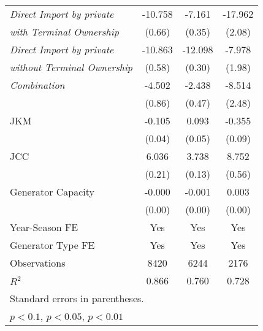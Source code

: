 \documentclass[12pt]{article}
\begin{document}
\begin{table}[htbp]
\begin{tabular}{l*{3}{c}}
\hline \hline
\addlinespace
\textit{Direct Import by private}    &     -10.758\sym{***}&      -7.161\sym{***}&     -17.962\sym{***} \\
\textit{with Terminal Ownership}   &      (0.66)         &      (0.35)         &      (2.08)              \\
\addlinespace
\textit{Direct Import by private}&     -10.863\sym{***}&     -12.098\sym{***}&      -7.978\sym{***}   \\
\textit{without Terminal Ownership}  &      (0.58)         &      (0.30)         &      (1.98)            \\
\addlinespace
\textit{Combination} &      -4.502\sym{***}&      -2.438\sym{***}&      -8.514\sym{***}  \\
                    &      (0.86)         &      (0.47)         &      (2.48)          \\
\addlinespace
JKM                 &      -0.105\sym{**} &       0.093\sym{*}  &      -0.355\sym{***}  \\
                    &      (0.04)         &      (0.05)         &      (0.09)             \\
\addlinespace
JCC                 &       6.036\sym{***}&       3.738\sym{***}&       8.752\sym{***}  \\
                    &      (0.21)         &      (0.13)         &      (0.56)         \\
\addlinespace
Generator Capacity          &      -0.000         &      -0.001\sym{***}&       0.003             \\
                    &      (0.00)         &      (0.00)         &      (0.00)       \\
\midrule
Year-Season FE         &    Yes &    Yes&    Yes\\  
Generator Type FE        &    Yes &    Yes&    Yes\\  
Observations                    &    8420         &    6244         &    2176           \\
$R^2$                   &       0.866         &       0.760         &       0.728               \\
\bottomrule
\multicolumn{4}{l}{\footnotesize Standard errors in parentheses.}\\
\multicolumn{4}{l}{\footnotesize \sym{*} \(p<0.1\), \sym{**} \(p<0.05\), \sym{***} \(p<0.01\)}\\
\end{tabular}
\end{table}
\end{document}
